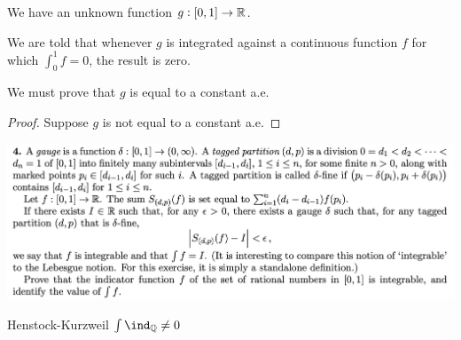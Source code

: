 \begin{intuition}
  We have an unknown function $g: [0, 1] \to \mathbb{R}$.

  We are told that whenever $g$ is integrated against a continuous function $f$ for which $\int_0^1 f = 0$, the
  result is zero.

  We must prove that $g$ is equal to a constant a.e.


\end{intuition}

\begin{proof}
  Suppose $g$ is not equal to a constant a.e.

\end{proof}


\newpage
\begin{mdframed}
\includegraphics[width=400pt]{img/analysis--berkeley-202a-hw09-955c.png}
\end{mdframed}

\begin{claim*}
  Henstock-Kurzweil $\int \ind_\Q \neq 0$
\end{claim*}

